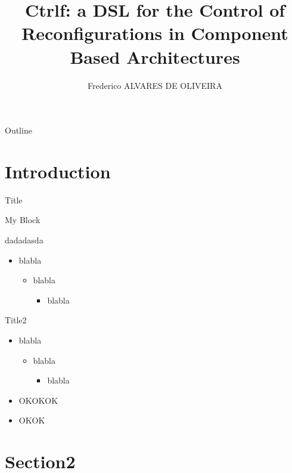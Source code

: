 \documentclass{beamer}
\title{Ctrlf: a DSL for the Control of Reconfigurations in Component Based Architectures}
\author{Frederico ALVARES DE OLIVEIRA}
\institute{Inria Grenoble - Equipe Ctrl-a}
\begin{document}
	\maketitle	

	\begin{frame}{Outline}
		\tableofcontents
	\end{frame}


\section{Introduction}

\begin{frame}{Title}
	\begin{block}{My Block}


dadadasda
	\begin{itemize}
		\item blabla
\begin{itemize}
		\item blabla
\begin{itemize}
		\item blabla
	\end{itemize}
	\end{itemize}
	\end{itemize}

	\end{block}
\end{frame}

\begin{frame}{Title2}

\begin{itemize}
		\item blabla
\begin{itemize}
		\item blabla
\begin{itemize}
		\item blabla
	\end{itemize}
	\end{itemize}
\item OKOKOK
\item OKOK

	\end{itemize}



\end{frame}

\section{Section2}
\end{document}
